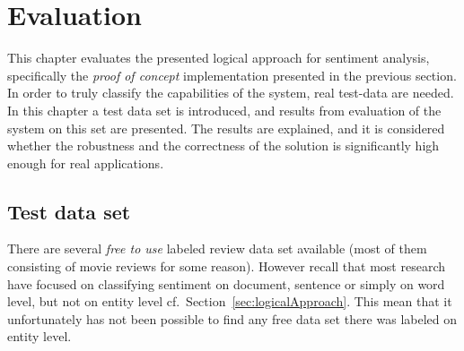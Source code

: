 
\chapter{Evaluation}
\label{chap:evaluation}

This chapter evaluates the presented logical approach for sentiment analysis, specifically the \emph{proof of concept} implementation presented in the previous section. In order to truly classify the capabilities of the system, real test-data are needed. In this chapter a test data set is introduced, and results from evaluation of the system on this set are presented. The results are explained, and it is considered whether the robustness and the correctness of the solution is significantly high enough for real applications.

\section{Test data set}
There are several \emph{free to use} labeled review data set available (most of them consisting of movie reviews for some reason). However recall that most research have focused on classifying sentiment on document, sentence or simply on word level, but not on entity level cf.\ Section~\vref{sec:logicalApproach}. This mean that it unfortunately has not been possible to find any free data set there was labeled on entity level. %

